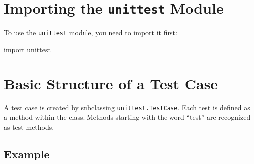 \documentclass[
  letterpaper,
  DIV=11,
  numbers=noendperiod]{scrreprt}
\newenvironment{Shaded}{\begin{snugshade}}{\end{snugshade}}
\newcommand{\ImportTok}[1]{\textcolor[rgb]{0.00,0.46,0.62}{#1}}
\newcommand{\NormalTok}[1]{\textcolor[rgb]{0.00,0.23,0.31}{#1}}
\begin{document}
\section{\texorpdfstring{Importing the \texttt{unittest}
Module}{Importing the unittest Module}}\label{importing-the-unittest-module}

To use the \texttt{unittest} module, you need to import it first:

\begin{Shaded}
\begin{Highlighting}[]
\ImportTok{import}\NormalTok{ unittest}
\end{Highlighting}
\end{Shaded}

\section{Basic Structure of a Test
Case}\label{basic-structure-of-a-test-case-1}

A test case is created by subclassing \texttt{unittest.TestCase}. Each
test is defined as a method within the class. Methods starting with the
word ``test'' are recognized as test methods.

\subsection{Example}\label{example-10}
\end{document}
